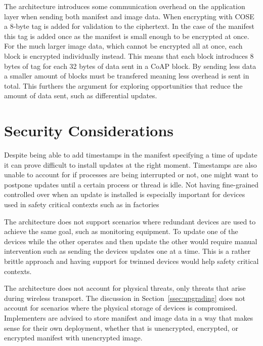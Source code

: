 \documentclass[0-thesis.tex]{subfiles}
\begin{document}
The architecture introduces some communication overhead on the application layer when
sending both manifest and image data. When encrypting with COSE a 8-byte tag is added for
validation to the ciphertext. In the case of the manifest this tag is added once as the
manifest is small enough to be encrypted at once. For the much larger image data, which
cannot be encrypted all at once, each block is encrypted individually instead. This means
that each block introduces 8 bytes of tag for each 32 bytes of data sent in a CoAP block.
By sending less data a smaller amount of blocks must be transfered meaning less overhead
is sent in total. This furthers the argument for exploring opportunities that reduce the
amount of data sent, such as differential updates.

\section{Security Considerations}
\label{sec:security-considerations}
Despite being able to add timestamps in the manifest specifying a time of update it can
prove difficult to install updates at the right moment. Timestamps are also unable to
account for if processes are being interrupted or not, one might want to postpone updates
until a certain process or thread is idle. Not having fine-grained controlled over when an
update is installed is especially important for devices used in safety critical contexts
such as in factories

The architecture does not support scenarios where redundant devices are used to achieve
the same goal, such as monitoring equipment. To update one of the devices while the other
operates and then update the other would require manual intervention such as sending the
devices updates one at a time. This is a rather brittle approach and having support for
twinned devices would help safety critical contexts.

The architecture does not account for physical threats, only threats that arise during
wireless transport. The discussion in Section~\ref{ssec:upgrading} does not account for
scenarios where the physical storage of devices is compromised. Implementers are advised
to store manifest and image data in a way that makes sense for their own deployment,
whether that is unencrypted, encrypted, or encrypted manifest with unencrypted image.
\end{document}
